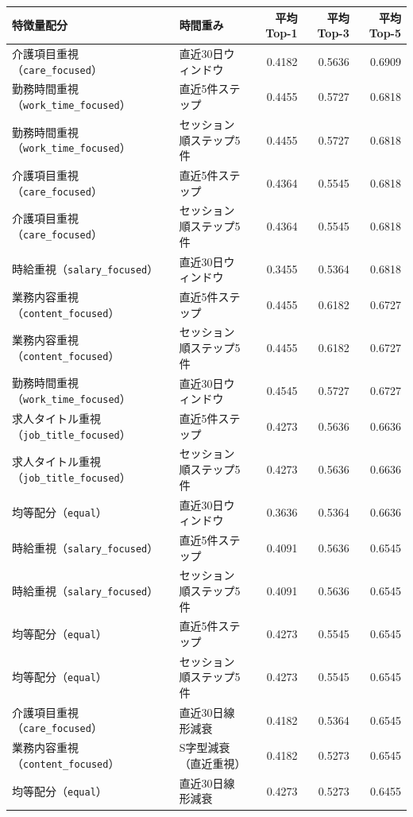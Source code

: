 \begin{tabularx}{\linewidth}{X X r r r}
\hline
特徴量配分 & 時間重み & 平均Top-1 & 平均Top-3 & 平均Top-5 \\
\hline
介護項目重視（\texttt{care\_focused}） & 直近30日ウィンドウ & 0.4182 & 0.5636 & 0.6909 \\
勤務時間重視（\texttt{work\_time\_focused}） & 直近5件ステップ & 0.4455 & 0.5727 & 0.6818 \\
勤務時間重視（\texttt{work\_time\_focused}） & セッション順ステップ5件 & 0.4455 & 0.5727 & 0.6818 \\
介護項目重視（\texttt{care\_focused}） & 直近5件ステップ & 0.4364 & 0.5545 & 0.6818 \\
介護項目重視（\texttt{care\_focused}） & セッション順ステップ5件 & 0.4364 & 0.5545 & 0.6818 \\
時給重視（\texttt{salary\_focused}） & 直近30日ウィンドウ & 0.3455 & 0.5364 & 0.6818 \\
業務内容重視（\texttt{content\_focused}） & 直近5件ステップ & 0.4455 & 0.6182 & 0.6727 \\
業務内容重視（\texttt{content\_focused}） & セッション順ステップ5件 & 0.4455 & 0.6182 & 0.6727 \\
勤務時間重視（\texttt{work\_time\_focused}） & 直近30日ウィンドウ & 0.4545 & 0.5727 & 0.6727 \\
求人タイトル重視（\texttt{job\_title\_focused}） & 直近5件ステップ & 0.4273 & 0.5636 & 0.6636 \\
求人タイトル重視（\texttt{job\_title\_focused}） & セッション順ステップ5件 & 0.4273 & 0.5636 & 0.6636 \\
均等配分（\texttt{equal}） & 直近30日ウィンドウ & 0.3636 & 0.5364 & 0.6636 \\
時給重視（\texttt{salary\_focused}） & 直近5件ステップ & 0.4091 & 0.5636 & 0.6545 \\
時給重視（\texttt{salary\_focused}） & セッション順ステップ5件 & 0.4091 & 0.5636 & 0.6545 \\
均等配分（\texttt{equal}） & 直近5件ステップ & 0.4273 & 0.5545 & 0.6545 \\
均等配分（\texttt{equal}） & セッション順ステップ5件 & 0.4273 & 0.5545 & 0.6545 \\
介護項目重視（\texttt{care\_focused}） & 直近30日線形減衰 & 0.4182 & 0.5364 & 0.6545 \\
業務内容重視（\texttt{content\_focused}） & S字型減衰（直近重視） & 0.4182 & 0.5273 & 0.6545 \\
均等配分（\texttt{equal}） & 直近30日線形減衰 & 0.4273 & 0.5273 & 0.6455 \\

\end{tabularx}
